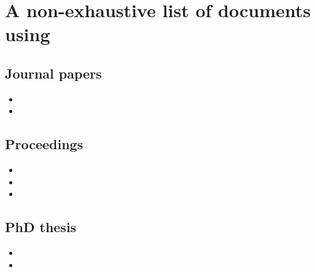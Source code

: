 \chapter[A non-exhastive list of documents using \sisyphe{}]{A non-exhaustive list of documents using \sisyphe{}}

\section{Journal papers}
\begin{itemize}
\item {}
\item {}
\end{itemize}
\section{Proceedings}
\begin{itemize}
\item {}
\item {}
\item {}
\end{itemize}

\section{PhD thesis}
\begin{itemize}
\item {}
\item {}
\end{itemize}

